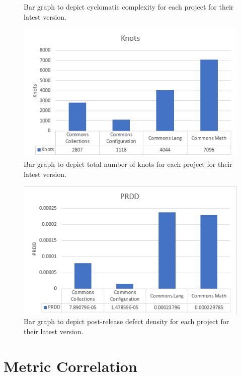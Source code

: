 \documentclass[letterpaper, 12 pt, conference]{ieeetran}  %
\begin{document}
\begin{figure}[H]
    \caption{Bar graph to depict cyclomatic complexity for each project for their latest version.}
     \vspace{0.00mm}
    \includegraphics[scale=0.7]{knots_analysis.png} %
    \caption{Bar graph to depict total number of knots for each project for their latest version.}
\end{figure}
 \begin{figure}[H]
    \centering
     \includegraphics[scale=0.7]{PRDD_analysis.png}%
    \caption{Bar graph to depict post-release defect density for each project for their latest version.}
 \end{figure}
 
\section{Metric Correlation}
\end{document}
